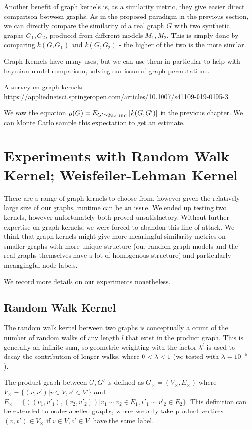 Another benefit of graph kernels is, as a similarity metric, they give easier direct comparison between graphs. As in the proposed paradigm in the previous section, we can directly compare the similarity of a real graph $G$ with two synthetic graphs $G_1, G_2$, produced from different models $M_1, M_2$. This is simply done by comparing $k(G, G_1)$ and $k(G, G_2)$ - the higher of the two is the more similar.


Graph Kernels have many uses, but we can use them in particular to help with bayesian model comparison, solving our issue of graph permutations.

A survey on graph kernels https://appliednetsci.springeropen.com/articles/10.1007/s41109-019-0195-3



We saw the equation $\mu(G) = E_{G' \sim \mathscr{G}_{\text{d-}\mathrm{GIRG}}} \left [ k(G, G') \right ]$ in the previous chapter. We can Monte Carlo sample this expectation to get an estimate.

\section{Experiments with Random Walk Kernel; Weisfeiler-Lehman Kernel}
There are a range of graph kernels to choose from, however given the relatively large size of our graphs, runtime can be an issue. We ended up testing two kernels, however unfortunately both proved unsatisfactory. Without further expertise on graph kernels, we were forced to abandon this line of attack. We think that graph kernels might give more meaningful similarity metrics on smaller graphs with more unique structure (our random graph models and the real graphs themselves have a lot of homogenous structure) and particularly meangingful node labels.

We record more details on our experiments nonetheless.

\subsection{Random Walk Kernel}
The random walk kernel between two graphs is conceptually a count of the number of random walks of any length $l$ that exist in the product graph. This is generally an infinite sum, so geometric weighting with the factor $\lambda^l$ is used to decay the contribution of longer walks, where $0 < \lambda < 1$ (we tested with $\lambda=10^{-5}$).

The product graph between $G, G'$ is defined as $G_\times = (V_\times, E_\times)$ where $V_\times = \{(v, v') | v \in V, v' \in V'\}$ and $E_\times = \{((v_1, v'_1), (v_2, v'_2)) | v_1 \sim v_2 \in E_1, v'_1 \sim v'_2 \in E_2\}$. This definition can be extended to node-labelled graphs, where we only take product vertices $(v, v') \in V_\times$ if $v \in V, v' \in V'$ have the same label.

